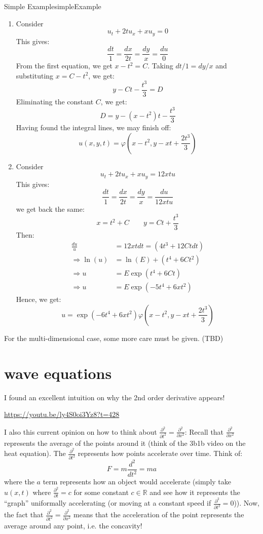 \documentclass{book}
\newcommand{\R}{{\mathbb{R}}}
\renewcommand{\phi}{\varphi}
\newcommand{\Rw}{\Rightarrow}
\begin{document}
\begin{example}{Simple Example}{simpleExample}
	\begin{enumerate}
		\item Consider
		\[
			u_t + 2tu_x + xu_y = 0
		\]
		This gives:
		\[
			\frac{dt}{1} = \frac{dx}{2t} = \frac{dy}{x} = \frac{du}{0}
		\]
		From the first equation, we get $x-t^2 = C$. Taking $dt/1 = dy/x$ and substituting $x = C-t^2$, we get:
		\[
			y-Ct - \frac{t^3}{3} = D
		\]
		Eliminating the constant $C$, we get:
		\[
			D = y  -(x-t^2)t - \frac{t^3}{3}
		\]
		Having found the integral lines, we may finish off:
		\[
			u(x,y,t) = \phi(x-t^2, y-xt + \frac{2t^3}{3})
		\]
	\item Consider
	\[
		u_t + 2tu_x + xu_y = 12xtu
	\]
	This gives:
	\[
		\frac{dt}{1} = \frac{dx}{2t} = \frac{dy}{x} = \frac{du}{12xtu}
	\]
	we get back the same:
	\[
		x = t^2 + C\qquad y = Ct + \frac{t^3}{3}
	\]
	Then:
	\begin{align*}
	 \frac{du}{u} &= 12xtdt = (4t^3+12Ctdt)\\
	 \Rw \ln(u)&= \ln(E)+(t^4+6Ct^2)\\
	 \Rw u &= E\exp(t^4+6Ct)\\
	 \Rw u &=E\exp(-5t^4 + 6xt^2)
	\end{align*}
	Hence, we get:
	\[
		u = \exp(-6t^4 + 6xt^2) \phi(x-t^2, y-xt + \frac{2t^3}{3})
	\]
	\end{enumerate}
\end{example}

For the multi-dimensional case, some more care must be given. (TBD)

\chapter{wave equations}
I found an excellent intuition on why the 2nd order derivative appears!
\begin{center}
	\url{https://youtu.be/ly4S0oi3Yz8?t=428}
\end{center}

I also this current opinion on how to think about $\frac{\partial^2}{\partial t^2} = \frac{\partial^2}{\partial x^2}$:
Recall that $\frac{\partial^2}{\partial x^2}$ represents the average of the points around it (think of the
3b1b video
on the heat equation). The $ \frac{\partial^2}{\partial t^2}$ represents how points accelerate over time. Think of:
\[
	F = m \frac{d^2}{d t^2} = ma
\]
where the $a$ term represents how an object would accelerate (simply take $u(x,t)$ where $ \frac{\partial^2}{\partial t}
= c$ for some constant $c \in \R$ and see how it represents the ``graph'' uniformally accelerating (or moving at
a constant speed if $ \frac{\partial^2}{\partial t^2} = 0$)). Now, the fact that $\frac{\partial^2}{\partial t^2}
= \frac{\partial^2}{\partial x^2}$ means that the acceleration of the point represents the average around any point,
i.e. the concavity!
\end{document}
